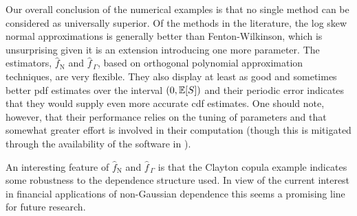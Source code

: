 Our overall conclusion of the numerical examples is that no single method can
be considered as universally superior. Of the methods in the literature,
the log skew normal approximations is generally better than Fenton-Wilkinson,
which is unsurprising given it is an extension introducing one more parameter.
The estimators, $\widehat{f}_{\mathrm{N}}$ and $\widehat{f}_{\,\Gamma}$, based on orthogonal polynomial approximation techniques, are very flexible. They also display at least as good and sometimes better pdf estimates over the interval $(0, \operatorname{{\mathbb E}}[S])$ and their periodic error indicates that they would supply even more accurate cdf estimates. One should note, however, that their
performance relies on the tuning of parameters and that somewhat
greater effort is involved in their computation (though this is mitigated through the availability
of the software in \cite{OrthogoCode}).

An interesting feature of $\widehat{f}_{\mathrm{N}}$ and $\widehat{f}_{\,\Gamma}$ is that
the Clayton copula example indicates some robustness to the dependence structure used.
In view of the current interest in financial applications of non-Gaussian dependence this
seems a promising line for future research.

